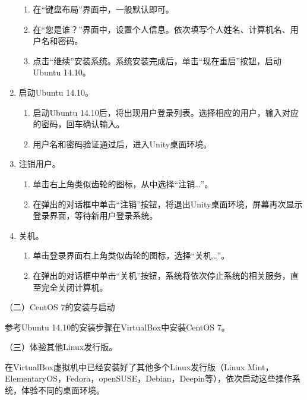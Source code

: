 \begin{enumerate}
\begin{enumerate}
      \item 在“键盘布局”界面中，一般默认即可。
      \item 在“您是谁？”界面中，设置个人信息。依次填写个人姓名、计算机名、用户名和密码。
      \item 点击“继续”安装系统。系统安装完成后，单击“现在重启”按钮，启动Ubuntu 14.10。
    \end{enumerate}
  \item 启动Ubuntu 14.10。
    \begin{enumerate}
      \item 启动Ubuntu 14.10后，将出现用户登录列表。选择相应的用户，输入对应的密码，回车确认输入。
      \item 用户名和密码验证通过后，进入Unity桌面环境。
    \end{enumerate}
  \item 注销用户。
    \begin{enumerate}
      \item 单击右上角类似齿轮的图标，从中选择“注销…”。
      \item 在弹出的对话框中单击“注销”按钮，将退出Unity桌面环境，屏幕再次显示登录界面，等待新用户登录系统。
    \end{enumerate}
  \item 关机。
    \begin{enumerate}
      \item 单击登录界面右上角类似齿轮的图标，选择“关机…”。
      \item 在弹出的对话框中单击“关机”按钮，系统将依次停止系统的相关服务，直至完全关闭计算机。
    \end{enumerate}
\end{enumerate}

\vspace{0.1in}
（二）CentOS 7的安装与启动

参考Ubuntu 14.10的安装步骤在VirtualBox中安装CentOS 7。

\vspace{0.1in}
（三）体验其他Linux发行版。

在VirtualBox虚拟机中已经安装好了其他多个Linux发行版（Linux Mint，ElementaryOS，Fedora，openSUSE，Debian，Deepin等），依次启动这些操作系统，体验不同的桌面环境。
